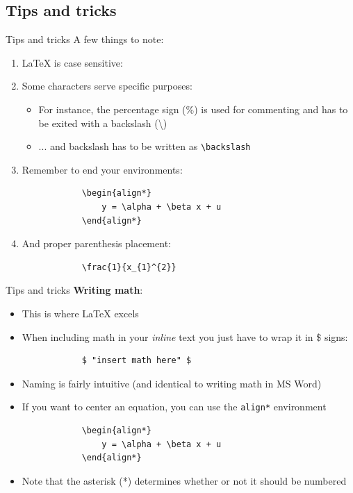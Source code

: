 \documentclass[10pt]{beamer}
\begin{document}
\subsection{Tips and tricks}
\begin{frame}[fragile]{Tips and tricks}
    A few things to note: 
    \begin{enumerate}
        \item<2-> \LaTeX \: is \alert{case sensitive}:
        \item<3-> Some characters serve \alert{specific purposes}:
        \begin{itemize}
            \item<4-> For instance, the percentage sign (\%) is used for commenting and has to be exited with a backslash (\textbackslash) 
            \item <5-> ... and backslash has to be written as \lstinline{\backslash}
        \end{itemize}
        \item<6-> Remember to end your environments:
        \begin{lstlisting}
            \begin{align*}
                y = \alpha + \beta x + u
            \end{align*}   
        \end{lstlisting}
        \item<7-> And proper parenthesis placement:
        \begin{lstlisting}
            \frac{1}{x_{1}^{2}}
        \end{lstlisting}
    \end{enumerate}
\end{frame}

\begin{frame}[fragile]{Tips and tricks}
    \textbf{Writing math}: 
    \begin{itemize}
        \item This is where \LaTeX \: \alert{excels}
        \item<2-> When including math in your \emph{inline} text you just have to wrap it in \$ signs:
        \begin{lstlisting}
            $ "insert math here" $
        \end{lstlisting}
        \item<4-> Naming is \alert{fairly intuitive} (and identical to writing math in MS Word)
        \item<5-> If you want to center an equation, you can use the \texttt{align*} environment 
         \begin{lstlisting}
            \begin{align*}
                y = \alpha + \beta x + u
            \end{align*}    
        \end{lstlisting}
        \item<6-> Note that the \alert{asterisk (*)} determines whether or not it should be numbered    
    \end{itemize}
\end{frame}
\end{document}
